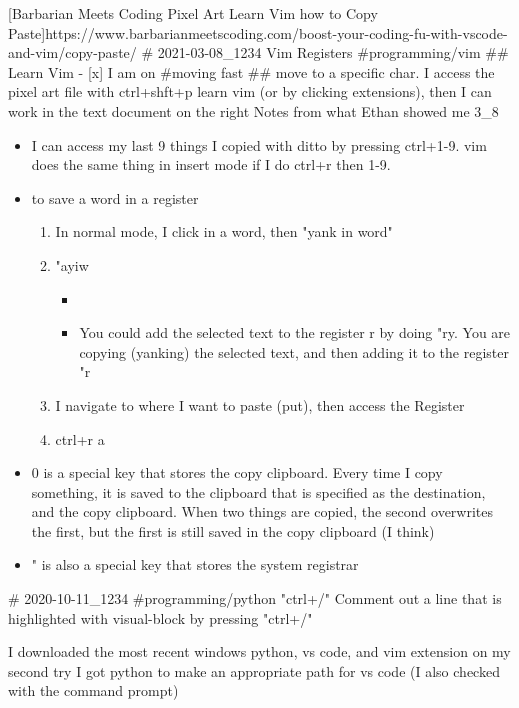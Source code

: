 [Barbarian Meets Coding Pixel Art Learn Vim how to Copy Paste]{https://www.barbarianmeetscoding.com/boost-your-coding-fu-with-vscode-and-vim/copy-paste/}
# 2021-03-08_1234 Vim Registers
#programming/vim
## Learn Vim
- [x] I am on \#moving fast \#\# move to a specific char. I access the pixel art file with ctrl+shft+p learn vim (or by clicking extensions), then I can work in the text document on the right
Notes from what Ethan showed me 3\_8
\begin{itemize}
\item
  I can access my last 9 things I copied with ditto by pressing
  ctrl+1-9. vim does the same thing in insert mode if I do ctrl+r then
  1-9.
\item
  to save a word in a register

  \begin{enumerate}
  \tightlist
  \item
    In normal mode, I click in a word, then "yank in word"
  \item
    "ayiw

    \begin{itemize}
    \tightlist
    \item
    \item You could add the selected text to the register r by doing "ry. You are copying (yanking) the selected text, and then adding it to the register "r
    \end{itemize}
  \item
    I navigate to where I want to paste (put), then access the Register
  \item
    ctrl+r a
  \end{enumerate}
\item
  0 is a special key that stores the copy clipboard. Every time I copy
  something, it is saved to the clipboard that is specified as the
  destination, and the copy clipboard. When two things are copied, the
  second overwrites the first, but the first is still saved in the copy
  clipboard (I think)
\item
  " is also a special key that stores the system registrar
\end{itemize}

# 2020-10-11_1234
#programming/python
"ctrl+/" Comment out a line that is highlighted with visual-block by pressing "ctrl+/"

I downloaded the most recent windows python, vs code, and vim extension
on my second try I got python to make an appropriate path for vs code (I
also checked with the command prompt)

